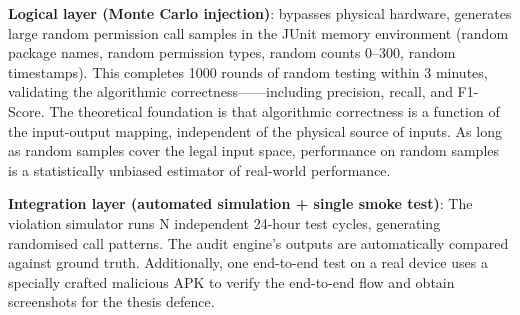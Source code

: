 \textbf{Logical layer (Monte Carlo injection)}: bypasses physical hardware, generates large random permission call samples in the JUnit memory environment (random package names, random permission types, random counts 0--300, random timestamps). This completes 1000 rounds of random testing within 3 minutes, validating the algorithmic correctness——including precision, recall, and F1-Score. The theoretical foundation is that algorithmic correctness is a function of the input-output mapping, independent of the physical source of inputs. As long as random samples cover the legal input space, performance on random samples is a statistically unbiased estimator of real-world performance.

\textbf{Integration layer (automated simulation + single smoke test)}: The violation simulator runs N independent 24-hour test cycles, generating randomised call patterns. The audit engine's outputs are automatically compared against ground truth. Additionally, one end-to-end test on a real device uses a specially crafted malicious APK to verify the end-to-end flow and obtain screenshots for the thesis defence.